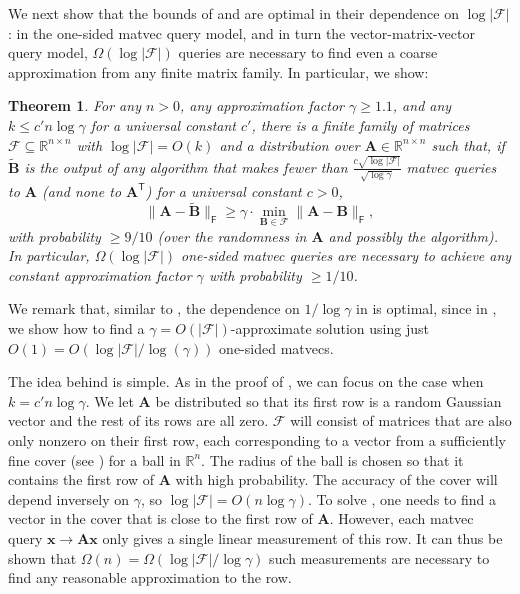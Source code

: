 \documentclass{article}[11pt]
\newtheorem{theorem}{Theorem}
\theoremstyle{definition}
\newcommand{\bv}[1]{\boldsymbol{\mathbf{#1}}}
\newcommand{\R}{\mathbb{R}}
\newcommand{\Fro}{\mathsf{F}}
\newcommand{\F}{\mathcal{F}}
\newcommand{\transpose}{\mathsf{T}}
\begin{document}
We next show that the bounds of  and  are optimal in their dependence on $\log |\F|$: in the one-sided matvec query model, and in turn the vector-matrix-vector query model, $ \Omega(\log |\F|)$ queries are necessary to find even a coarse approximation from any finite matrix family. In particular, we show: 

\begin{theorem}
\label{thm:lower_bound_onesided}
For any $n > 0$, any approximation factor $\gamma \ge 1.1$, and any $k \leq c'n \log \gamma$ for a universal constant $c'$, there 
    is a finite family of matrices $\F \subseteq \R^{n\times n}$ with $\log |\F| = O(k)$ and a distribution over  $\bv A \in \R^{n \times n}$ such that, if $\bv{\tilde B}$ is the output of any algorithm that makes fewer than $\frac{c\sqrt{\log|\F|}}{\sqrt{\log \gamma}}$ matvec queries to $\bv A$ (and none to $\bv A^\transpose$) for a universal constant $c > 0$, 
\[ \|\bv A- \bv{\tilde B}\|_\Fro \geq \gamma \cdot \min_{\bv B \in \F} \|\bv A - \bv B\|_\Fro, \]
 with probability $\geq 9/10$ (over the randomness in $\bv A$ and possibly the algorithm).
In particular, $\Omega(\log |\F|)$ one-sided matvec queries are necessary to achieve any constant approximation factor $\gamma$ with probability $\ge 1/10$.
\end{theorem}
We remark that, similar to , the dependence on $1/\log \gamma$ in  is optimal, since in , we show how to find a $\gamma = O(|\F|)$-approximate solution using just $O(1) = O(\log |\F|/\log(\gamma))$ one-sided matvecs.

The idea behind  is simple. As in the proof of , we can focus on the case when $k = c' n\log \gamma$. We let $\bv{A}$ be distributed so that its first row is a random Gaussian vector and the rest of its rows are all zero. $\F$ will consist of matrices that are also only nonzero on their first row, each corresponding to a vector from a sufficiently fine cover (see ) for a ball in $\R^n$. The radius of the ball is chosen so that it contains the first row of $\bv A$ with high probability. The accuracy of the cover will depend inversely on $\gamma$, so $\log |\F| = O(n  \log \gamma)$.
To solve , one needs to find a vector in the cover that is close to the first row of $\bv A$. However, each matvec query $\bv x \rightarrow \bv A \bv x$ only gives a single linear measurement of this row. It can thus be shown that $\Omega(n) = \Omega(\log|\F|/\log \gamma)$ such measurements are necessary to find any reasonable approximation to the row. 
\end{document}
